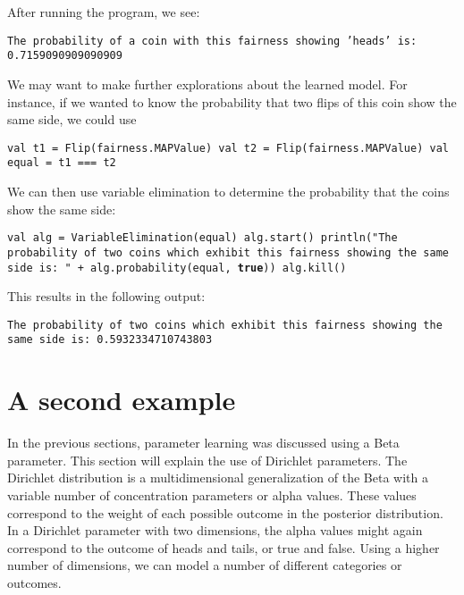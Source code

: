 After running the program, we see:

\begin{flushleft}
\texttt{The probability of a coin with this fairness showing 'heads' is:
0.7159090909090909}
\end{flushleft}

We may want to make further explorations about the learned model. For instance, if we wanted to know the probability that two flips of this coin show the same side, we could use

\begin{flushleft}
\texttt{val t1 = Flip(fairness.MAPValue) 
\newline val t2 = Flip(fairness.MAPValue) 
\newline val equal = t1 === t2}
\end{flushleft}

We can then use variable elimination to determine the probability that the coins show the same side:

\begin{flushleft}
\texttt{val alg = VariableElimination(equal)
\newline alg.start()
\newline println("The probability of two coins which exhibit this fairness showing the same side is: " + alg.probability(equal, \textbf{true}))
\newline alg.kill()
}
\end{flushleft}

This results in the following output:

\begin{flushleft}
\texttt{The probability of two coins which exhibit this fairness showing the same side is: 0.5932334710743803}
\end{flushleft}

\section{A second example}

In the previous sections, parameter learning was discussed using a Beta parameter. This section will explain the use of Dirichlet parameters. The Dirichlet distribution is a multidimensional generalization of the Beta with a variable number of concentration parameters or alpha values. These values correspond to the weight of each possible outcome in the posterior distribution. In a Dirichlet parameter with two dimensions, the alpha values might again correspond to the outcome of heads and tails, or true and false. Using a higher number of dimensions, we can model a number of different categories or outcomes.

